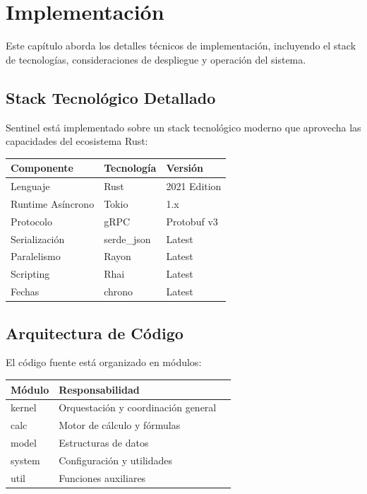 \chapter{Implementación}

\bigskip

Este capítulo aborda los detalles técnicos de implementación, incluyendo el stack de tecnologías, consideraciones de despliegue y operación del sistema.

\bigskip

\section{Stack Tecnológico Detallado}

Sentinel está implementado sobre un stack tecnológico moderno que aprovecha las capacidades del ecosistema Rust:

\bigskip

\begin{center}
\begin{tabular}{lll}
\toprule
\textbf{Componente} & \textbf{Tecnología} & \textbf{Versión} \\
\midrule
Lenguaje & Rust & 2021 Edition \\
Runtime Asíncrono & Tokio & 1.x \\
Protocolo & gRPC & Protobuf v3 \\
Serialización & serde\_json & Latest \\
Paralelismo & Rayon & Latest \\
Scripting & Rhai & Latest \\
Fechas & chrono & Latest \\
\bottomrule
\end{tabular}
\end{center}

\bigskip

\section{Arquitectura de Código}

El código fuente está organizado en módulos:

\bigskip

\begin{center}
\begin{tabular}{llp{8cm}}
\toprule
\textbf{Módulo} & \textbf{Responsabilidad} \\
\midrule
kernel & Orquestación y coordinación general \\
calc & Motor de cálculo y fórmulas \\
model & Estructuras de datos \\
system & Configuración y utilidades \\
util & Funciones auxiliares \\
\bottomrule
\end{tabular}
\end{center}

